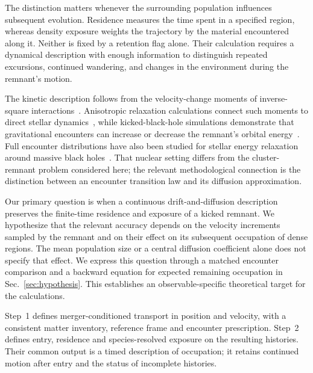 \documentclass[aps,prd,reprint,amsmath,amssymb,superscriptaddress,nofootinbib,longbibliography,floatfix]{revtex4-2}
\begin{document}
The distinction matters whenever the surrounding population influences subsequent evolution. Residence measures the time spent in a specified region, whereas density exposure weights the trajectory by the material encountered along it. Neither is fixed by a retention flag alone. Their calculation requires a dynamical description with enough information to distinguish repeated excursions, continued wandering, and changes in the environment during the remnant's motion.

The kinetic description follows from the velocity-change moments of inverse-square interactions~\cite{Rosenbluth1957}. Anisotropic relaxation calculations connect such moments to direct stellar dynamics~\cite{Tep2022}, while kicked-black-hole simulations demonstrate that gravitational encounters can increase or decrease the remnant's orbital energy~\cite{Webb2018}. Full encounter distributions have also been studied for stellar energy relaxation around massive black holes~\cite{BarOr2013}. That nuclear setting differs from the cluster-remnant problem considered here; the relevant methodological connection is the distinction between an encounter transition law and its diffusion approximation.

Our primary question is when a continuous drift-and-diffusion description preserves the finite-time residence and exposure of a kicked remnant. We hypothesize that the relevant accuracy depends on the velocity increments sampled by the remnant and on their effect on its subsequent occupation of dense regions. The mean population size or a central diffusion coefficient alone does not specify that effect. We express this question through a matched encounter comparison and a backward equation for expected remaining occupation in Sec.~\ref{sec:hypothesis}. This establishes an observable-specific theoretical target for the calculations.

Step~1 defines merger-conditioned transport in position and velocity, with a consistent matter inventory, reference frame and encounter prescription. Step~2 defines entry, residence and species-resolved exposure on the resulting histories. Their common output is a timed description of occupation; it retains continued motion after entry and the status of incomplete histories.
\end{document}
